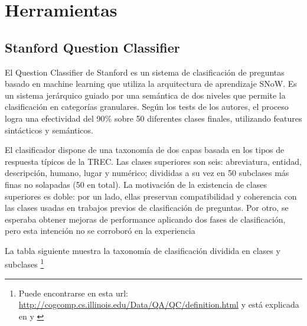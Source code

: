 \appendix
\chapter{Herramientas}
\label{chap:herramientas}

\section{Stanford Question Classifier}
\label{sec:stanford-qc}
El Question Classifier de Stanford \cite{QC2} es un sistema de clasificación de preguntas basado en machine learning que utiliza la arquitectura de aprendizaje SNoW. Es un sistema jerárquico guiado por una semántica de dos niveles que permite la clasificación en categorías granulares. Según los tests de los autores, el proceso logra una efectividad del 90\% sobre 50 diferentes clases finales, utilizando features sintácticos y semánticos.

El clasificador dispone de una taxonomía de dos capas basada en los tipos de respuesta típicos de la TREC. Las clases superiores son seis: abreviatura, entidad, descripción, humano, lugar y numérico; divididas a su vez en 50 subclases más finas no solapadas (50 en total). La motivación de la existencia de clases superiores es doble: por un lado, ellas preservan compatibilidad y coherencia con las clases usadas en trabajos previos de clasificación de preguntas. Por otro, se esperaba obtener mejoras de performance aplicando dos fases de clasificación, pero esta intención no se corroboró en la experiencia

La tabla siguiente muestra la taxonomía de clasificación dividida en clases y subclases \footnote{Puede encontrarse en esta url: \url{http://cogcomp.cs.illinois.edu/Data/QA/QC/definition.html} y está explicada en \cite{QC2} y \cite{QC3}}


